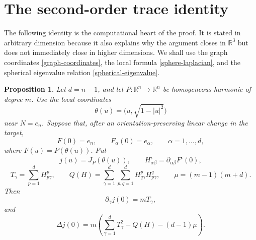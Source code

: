 \documentclass[10pt]{amsart}
\numberwithin{equation}{section}
\newtheorem{proposition}[theorem]{Proposition}
\theoremstyle{definition}
\newcommand{\R}{\mathbb R}
\begin{document}
\section{The second-order trace identity}
\label{sec-trace}

The following identity is the computational heart of the proof. It is stated
in arbitrary dimension because it also explains why the argument closes in
\(\R^3\) but does not immediately close in higher dimensions. We shall use
the graph coordinates \eqref{graph-coordinates}, the local formula
\eqref{sphere-laplacian}, and the spherical eigenvalue relation
\eqref{spherical-eigenvalue}.

\begin{proposition}
\label{prop-trace-formula}
Let \(d=n-1\), and let \(P:\R^n\to\R^n\) be homogeneous harmonic of degree
\(m\). Use the local coordinates
\[
        \theta(u)=\bigl(u,\sqrt{1-|u|^2}\bigr)
\]
near \(N=e_n\). Suppose that, after an orientation-preserving linear change
in the target,
\begin{equation}\label{normalization}
        F(0)=e_n,
        \qquad
        F_\alpha(0)=e_\alpha,\qquad \alpha=1,\ldots,d,
\end{equation}
where \(F(u)=P(\theta(u))\). Put
\[
        j(u)=J_P(\theta(u)),
        \qquad
        H^i_{\alpha\beta}=\partial_{\alpha\beta}F^i(0),
\]
\[
        T_\gamma=\sum_{p=1}^{d}H^p_{p\gamma},
        \qquad
        Q(H)=\sum_{\gamma=1}^{d}\sum_{p,q=1}^{d}
              H^p_{q\gamma}H^q_{p\gamma},
        \qquad
        \mu=(m-1)(m+d).
\]
Then
\begin{equation}\label{first-derivative-j}
        \partial_\gamma j(0)=mT_\gamma,
\end{equation}
and
\begin{equation}\label{trace-formula}
        \Delta j(0)
        =
        m\left(
          \sum_{\gamma=1}^{d}T_\gamma^2
          -
          Q(H)
          -
          (d-1)\mu
        \right).
\end{equation}
\end{proposition}
\end{document}
